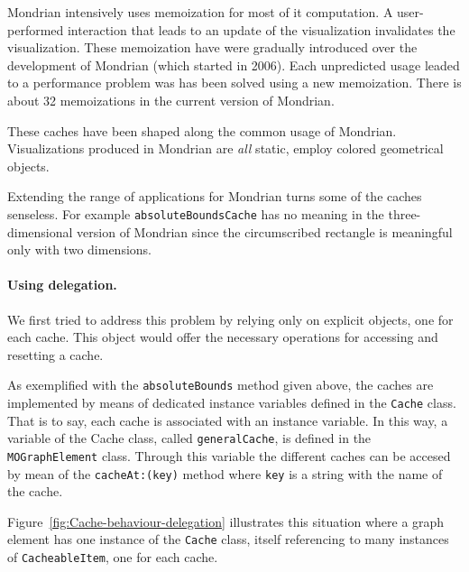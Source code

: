 \documentclass[preprint,10pt]{sigplanconf}
\newcommand{\ct}{\lstinline[backgroundcolor=\color{white},basicstyle=\footnotesize\ttfamily]}
\newcommand{\ab}[1]{\nb{Alexandre}{blue}{#1}}
\newcommand{\sv}[1]{\nb{Santiago}{orange}{#1}}
\newcommand{\figref}[1]{Figure~\ref{fig:#1}\xspace}
\begin{document}
Mondrian intensively uses memoization for most of it computation. A user-performed interaction that leads to an update of the visualization invalidates the visualization. These memoization have were gradually introduced over the development of Mondrian (which started in 2006). Each unpredicted usage leaded to a performance problem was has been solved using a new memoization. There is about 32 memoizations in the current version of Mondrian.

These caches have been shaped along the common usage of Mondrian. Visualizations produced in Mondrian are \emph{all} static, employ colored geometrical objects.

Extending the range of applications for Mondrian turns some of the caches senseless. For example \ct{absoluteBoundsCache} has no meaning in the three-dimensional version of Mondrian since the circumscribed rectangle is meaningful only with two dimensions.

\paragraph{Using delegation.}
We first tried to address this problem by relying only on explicit objects, one for each cache. This object would offer the necessary operations for accessing and resetting a cache.

As exemplified with the \ct{absoluteBounds} method given above, the caches are implemented by means of dedicated instance variables defined in the \ct{Cache} class. That is to say, each cache is associated with an instance variable. In this way, a variable of the Cache class, called \ct{generalCache}, is defined in the \ct{MOGraphElement} class. Through this variable the different caches can be accesed by mean of the \ct{cacheAt:(key)} method where \ct{key} is a string with the name of the cache.

\figref{Cache-behaviour-delegation} illustrates this situation where a graph element has one instance of the \ct{Cache} class, itself referencing to many instances of \ct{CacheableItem}, one for each cache.
\end{document}
